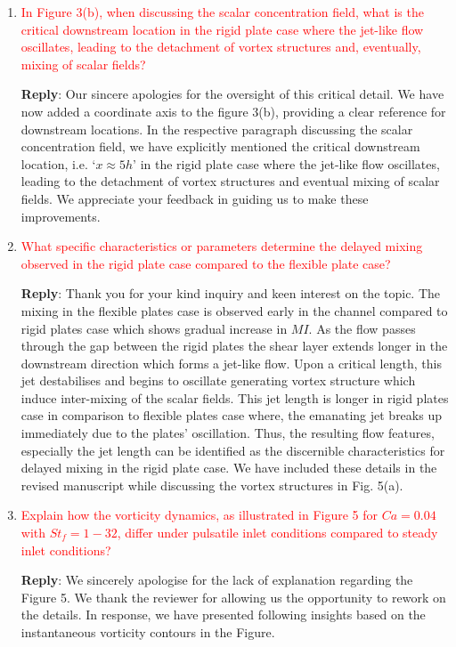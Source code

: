\documentclass[onecolumn,a4paper,amsmath,amssym,pre]{revtex4}
\begin{document}
\begin{enumerate}
					\item \textcolor{red}{In Figure 3(b), when discussing the scalar concentration field, what is the critical downstream location in the rigid plate case where the jet-like flow oscillates, leading to the detachment of vortex structures and, eventually, mixing of scalar fields?}
					
					\textbf{Reply}: Our sincere apologies for the oversight of this critical detail. We have now added a coordinate axis to the figure 3(b), providing a clear reference for downstream locations. In the respective paragraph discussing the scalar concentration field, we have explicitly mentioned the critical downstream location, i.e. `$x\approx5h$' in the rigid plate case where the jet-like flow oscillates, leading to the detachment of vortex structures and eventual mixing of scalar fields. We appreciate your feedback in guiding us to make these improvements.
					
					\item \textcolor{red}{What specific characteristics or parameters determine the delayed mixing observed in the rigid plate case compared to the flexible plate case?}
					
					\textbf{Reply}: Thank you for your kind inquiry and keen interest on the topic. The mixing in the flexible plates case is observed early in the channel compared to rigid plates case which shows gradual increase in $MI$. As the flow passes through the gap between the rigid plates the shear layer extends longer in the downstream direction which forms a jet-like flow. Upon a critical length, this jet destabilises and begins to oscillate generating vortex structure which induce inter-mixing of the scalar fields. This jet length is longer in rigid plates case in comparison to flexible plates case where, the emanating jet breaks up immediately due to the plates' oscillation. Thus, the resulting flow features, especially the jet length can be identified as the discernible characteristics for delayed mixing in the rigid plate case. We have included these details in the revised manuscript while discussing the vortex structures in Fig. 5(a).
					
					\item \textcolor{red}{Explain how the vorticity dynamics, as illustrated in Figure 5 for $Ca = 0.04$ with $St_f = 1-32$, differ under pulsatile inlet conditions compared to steady inlet conditions?}
					
					
					\textbf{Reply}: We sincerely apologise for the lack of explanation regarding the Figure 5. We thank the reviewer for allowing us the opportunity to rework on the details. In response, we have presented following insights based on the instantaneous vorticity contours in the Figure.
					

\end{enumerate}
\end{document}
